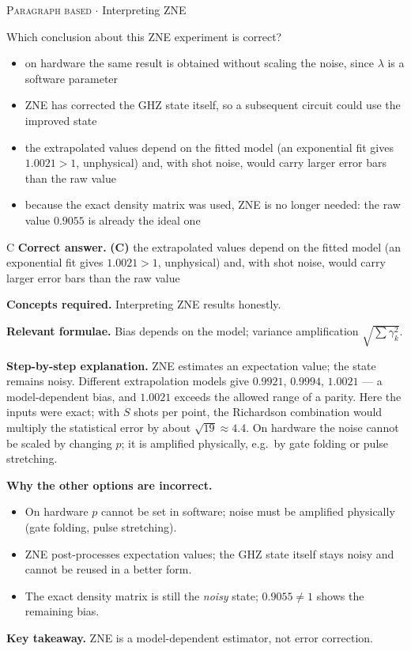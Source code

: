 \documentclass[11pt,a4paper]{article}
\newcommand{\optlabel}[1]{\textbf{(#1)}}
\newcommand{\correctlabel}[1]{\textcolor{okgreen}{\textbf{(#1)}\,\ding{51}}}
\newenvironment{qitem}[1]{\begin{list}{}{\setlength{\leftmargin}{3.3em}\setlength{\labelwidth}{3.1em}%
  \setlength{\labelsep}{0.2em}\setlength{\topsep}{3pt}\setlength{\parsep}{3pt}}\item[\textbf{Q.#1}\hfill]}{\end{list}}
\newcommand{\qsep}{\par\vspace{2pt}{\color{black!15}\hrule}\vspace{4pt}}
\newcommand{\qmeta}[2]{{\footnotesize\color{black!60}\textsc{#1} \;$\cdot$\; #2}\par}
\begin{document}
\qsep

\begin{qitem}{80}
\qmeta{Paragraph based}{Interpreting ZNE}
Which conclusion about this ZNE experiment is correct?
\begin{itemize}[leftmargin=2.6em, labelsep=0.4em, itemsep=2pt, topsep=3pt]
\item[\optlabel{A}] on hardware the same result is obtained without scaling the noise, since $\lambda$ is a software parameter
\item[\optlabel{B}] ZNE has corrected the GHZ state itself, so a subsequent circuit could use the improved state
\item[\correctlabel{C}] the extrapolated values depend on the fitted model (an exponential fit gives $1.0021 > 1$, unphysical) and, with shot noise, would carry larger error bars than the raw value
\item[\optlabel{D}] because the exact density matrix was used, ZNE is no longer needed: the raw value $0.9055$ is already the ideal one
\end{itemize}
\end{qitem}
\begin{solbox}{C}
\textbf{\color{brand}Correct answer.} \textcolor{okgreen}{\textbf{(C)}} the extrapolated values depend on the fitted model (an exponential fit gives $1.0021 > 1$, unphysical) and, with shot noise, would carry larger error bars than the raw value

\textbf{\color{brand}Concepts required.} Interpreting ZNE results honestly.

\textbf{\color{brand}Relevant formulae.} Bias depends on the model; variance amplification $\sqrt{\sum\gamma_k^2}$.

\textbf{\color{brand}Step-by-step explanation.} ZNE estimates an expectation value; the state remains noisy. Different extrapolation models give $0.9921$, $0.9994$, $1.0021$ --- a model-dependent
bias, and $1.0021$ exceeds the allowed range of a parity. Here the inputs were exact; with $S$ shots per point, the Richardson combination would multiply the
statistical error by about $\sqrt{19} \approx 4.4$. On hardware the noise cannot be scaled by changing $p$; it is amplified physically, e.g.\ by gate folding or pulse
stretching.

\textbf{\color{brand}Why the other options are incorrect.}
\begin{itemize}[leftmargin=2.4em, itemsep=1pt, topsep=2pt]
\item[\textbf{(A)}] On hardware $p$ cannot be set in software; noise must be amplified physically (gate folding, pulse stretching).
\item[\textbf{(B)}] ZNE post-processes expectation values; the GHZ state itself stays noisy and cannot be reused in a better form.
\item[\textbf{(D)}] The exact density matrix is still the \emph{noisy} state; $0.9055 \neq 1$ shows the remaining bias.
\end{itemize}
\textbf{\color{brand}Key takeaway.} ZNE is a model-dependent estimator, not error correction.
\end{solbox}
\qsep
\end{document}
